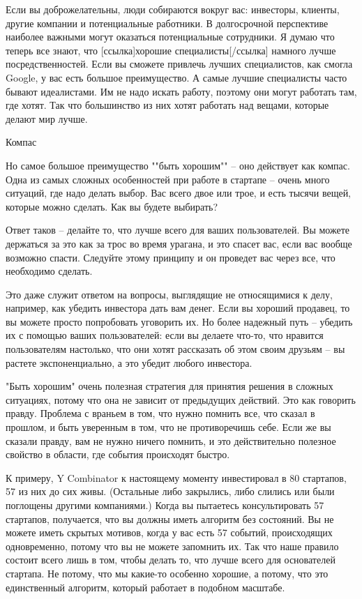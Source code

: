 \documentclass[ebook,12pt,oneside,openany]{memoir}
\begin{document}
Если вы доброжелательны, люди собираются вокруг вас: инвесторы,
клиенты, другие компании и потенциальные работники. В долгосрочной
перспективе наиболее важными могут оказаться потенциальные сотрудники.
Я думаю что теперь все знают, что [ссылка]хорошие специалисты[/ссылка]
намного лучше посредственностей. Если вы сможете привлечь лучших
специалистов, как смогла Google, у вас есть большое преимущество. А
самые лучшие специалисты часто бывают идеалистами. Им не надо искать
работу, поэтому они могут работать там, где хотят. Так что большинство
из них хотят работать над вещами, которые делают мир лучше.

Компас

Но самое большое преимущество ""быть хорошим"" -- оно действует как
компас. Одна из самых сложных особенностей при работе в стартапе --
очень много ситуаций, где надо делать выбор. Вас всего двое или трое,
и есть тысячи вещей, которые можно сделать. Как вы будете выбирать?

Ответ таков -- делайте то, что лучше всего для ваших пользователей. Вы
можете держаться за это как за трос во время урагана, и это спасет
вас, если вас вообще возможно спасти. Следуйте этому принципу и он
проведет вас через все, что необходимо сделать.

Это даже служит ответом на вопросы, выглядящие не относящимися к делу,
например, как убедить инвестора дать вам денег. Если вы хороший
продавец, то вы можете просто попробовать уговорить их. Но более
надежный путь -- убедить их с помощью ваших пользователей: если вы
делаете что-то, что нравится пользователям настолько, что они хотят
рассказать об этом своим друзьям -- вы растете экспоненциально, а это
убедит любого инвестора.

"Быть хорошим" очень полезная стратегия для принятия решения в сложных
ситуациях, потому что она не зависит от предыдущих действий. Это как
говорить правду. Проблема с враньем в том, что нужно помнить все, что
сказал в прошлом, и быть уверенным в том, что не противоречишь себе.
Если же вы сказали правду, вам не нужно ничего помнить, и это
действительно полезное свойство в области, где события происходят
быстро.

К примеру, Y Combinator к настоящему моменту инвестировал в 80
стартапов, 57 из них до сих живы. (Остальные либо закрылись, либо
слились или были поглощены другими компаниями.) Когда вы пытаетесь
консультировать 57 стартапов, получается, что вы должны иметь алгоритм
без состояний. Вы не можете иметь скрытых мотивов, когда у вас есть 57
событий, происходящих одновременно, потому что вы не можете запомнить
их. Так что наше правило состоит всего лишь в том, чтобы делать то,
что лучше всего для основателей стартапа. Не потому, что мы какие-то
особенно хорошие, а потому, что это единственный алгоритм, который
работает в подобном масштабе.
\end{document}
